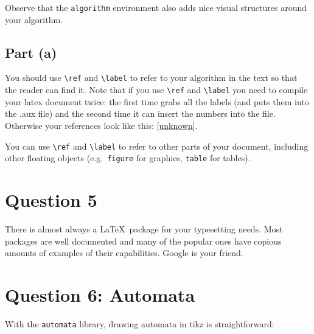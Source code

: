 \documentclass{article} %
\begin{document}
Observe that the \texttt{algorithm} environment also adds nice visual structures around your algorithm.

\subsection*{Part (a)}

You should use \verb|\ref| and \verb|\label| to refer to your algorithm in the text so that the reader can find it.  Note that if you use \verb|\ref| and \verb|\label| you need to compile your latex document twice: the first time grabs all the labels (and puts them into the .aux file) and the second time it can insert the numbers into the file.  Otherwise your references look like this: \ref{unknown}.


You can use \verb|\ref| and \verb|\label| to refer to other parts of your document, including other floating objects (e.g.\ \texttt{figure} for graphics, \texttt{table} for tables). 
\section*{Question 5}
There is almost always a \LaTeX\ package for your typesetting needs.  Most packages are well documented and many of the popular ones have copious amounts of examples of their capabilities.  Google is your friend.

\section*{Question 6: Automata}

With the \texttt{automata} library, drawing automata in tikz is straightforward:
\begin{center}
\end{center}
\end{document}
